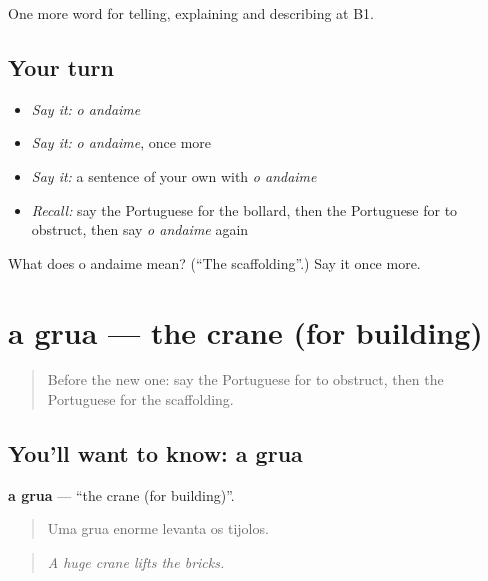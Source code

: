 \begin{grammarlens}[title={What you've built}]
One more word for telling, explaining and describing at B1.
\end{grammarlens}

\subsection*{Your turn}
\begin{itemize}
\raggedright
  \item \emph{Say it:} \emph{o andaime}
  \item \emph{Say it:} \emph{o andaime}, once more
  \item \emph{Say it:} a sentence of your own with \emph{o andaime}
  \item \emph{Recall:} say the Portuguese for the bollard, then the Portuguese for to obstruct, then say \emph{o andaime} again
\end{itemize}

\begin{tcolorbox}[breakable,colback=teal!4,colframe=teal!35!black,title={Before you move on}]
What does o andaime mean? (\textquotedblleft{}The scaffolding\textquotedblright{}.) Say it once more.
\end{tcolorbox}
\section[a grua]{a grua — the crane (for building)}

\label{lesson:PT-C445-grua}



\begin{quote}
Before the new one: say the Portuguese for to obstruct, then the Portuguese for the scaffolding.
\end{quote}

\subsection*{You'll want to know: a grua}
\textbf{a grua} — \textquotedblleft{}the crane (for building)\textquotedblright{}.

\begin{quote}
Uma grua enorme levanta os tijolos.
\end{quote}

\begin{quote}
\emph{A huge crane lifts the bricks.}
\end{quote}

